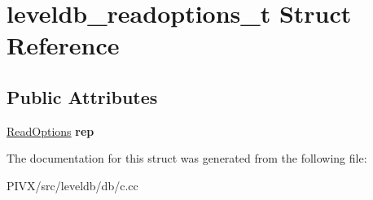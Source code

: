 \hypertarget{structleveldb__readoptions__t}{}\section{leveldb\+\_\+readoptions\+\_\+t Struct Reference}
\label{structleveldb__readoptions__t}
\subsection*{Public Attributes}
\begin{DoxyCompactItemize}
\item 
\mbox{\label{structleveldb__readoptions__t_ad4bc0f881cf2c7a859642cd878dd568c}} 
\mbox{\hyperlink{structleveldb_1_1_read_options}{Read\+Options}} {\bfseries rep}
\end{DoxyCompactItemize}


The documentation for this struct was generated from the following file\+:\begin{DoxyCompactItemize}
\item 
P\+I\+V\+X/src/leveldb/db/c.\+cc\end{DoxyCompactItemize}
